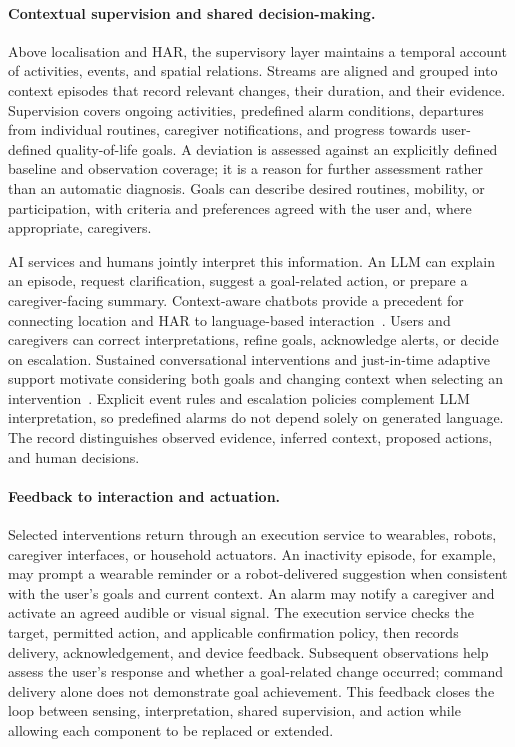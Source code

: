 \documentclass[10pt,twocolumn]{article}
\begin{document}
\paragraph{Contextual supervision and shared decision-making.}
Above localisation and HAR, the supervisory layer maintains a temporal account of activities, events, and spatial relations. Streams are aligned and grouped into context episodes that record relevant changes, their duration, and their evidence. Supervision covers ongoing activities, predefined alarm conditions, departures from individual routines, caregiver notifications, and progress towards user-defined quality-of-life goals. A deviation is assessed against an explicitly defined baseline and observation coverage; it is a reason for further assessment rather than an automatic diagnosis. Goals can describe desired routines, mobility, or participation, with criteria and preferences agreed with the user and, where appropriate, caregivers.

AI services and humans jointly interpret this information. An LLM can explain an episode, request clarification, suggest a goal-related action, or prepare a caregiver-facing summary. Context-aware chatbots provide a precedent for connecting location and HAR to language-based interaction~\cite{polo2025chatbots}. Users and caregivers can correct interpretations, refine goals, acknowledge alerts, or decide on escalation. Sustained conversational interventions and just-in-time adaptive support motivate considering both goals and changing context when selecting an intervention~\cite{bickmore2013interventions,nahumshani2018jitai}. Explicit event rules and escalation policies complement LLM interpretation, so predefined alarms do not depend solely on generated language. The record distinguishes observed evidence, inferred context, proposed actions, and human decisions.

\paragraph{Feedback to interaction and actuation.}
Selected interventions return through an execution service to wearables, robots, caregiver interfaces, or household actuators. An inactivity episode, for example, may prompt a wearable reminder or a robot-delivered suggestion when consistent with the user's goals and current context. An alarm may notify a caregiver and activate an agreed audible or visual signal. The execution service checks the target, permitted action, and applicable confirmation policy, then records delivery, acknowledgement, and device feedback. Subsequent observations help assess the user's response and whether a goal-related change occurred; command delivery alone does not demonstrate goal achievement. This feedback closes the loop between sensing, interpretation, shared supervision, and action while allowing each component to be replaced or extended.
\end{document}
